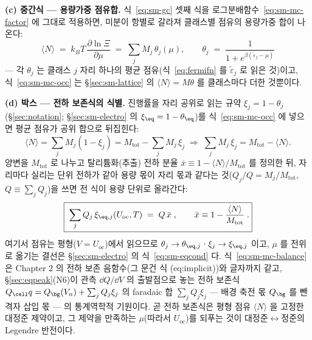 \textbf{(c) 중간식 --- 용량가중 점유합.} 식~\eqref{eq:sm-gc} 셋째 식을 로그분배함수~\eqref{eq:sm-mc-factor} 에
그대로 적용하면, 미분이 항별로 갈라져 클래스별 점유의 용량가중 합이 나온다:
\begin{equation}
\langle N\rangle\;=\;k_BT\,\frac{\partial\ln\Xi}{\partial\mu}
\;=\;\sum_j M_j\,\theta_j(\mu),
\qquad
\theta_j\;=\;\frac{1}{1+e^{\beta(\tilde\varepsilon_j-\mu)}}
\label{eq:sm-mc-occ}
\end{equation}
--- 각 $\theta_j$ 는 클래스 $j$ 자리 하나의 평균 점유(식~\eqref{eq:fermifn} 를 $\tilde\varepsilon_j$ 로 읽은
것)이고, 식~\eqref{eq:sm-mc-occ} 는 \S\ref{sec:sm-lattice} 의 $\langle N\rangle=M\theta$ 를 클래스마다 더한
것뿐이다.

\textbf{(d) 박스 --- 전하 보존식의 식별.} 진행률을 자리 공위로 읽는 규약 $\xi_j=1-\theta_j$(\S\ref{sec:notation};
\S\ref{sec:sm-electro} 의 $\xi_\eq=1-\theta_\eq$)를 식~\eqref{eq:sm-mc-occ} 에 넣으면 평균 점유가 공위 합으로
뒤집힌다:
\begin{equation}
\langle N\rangle=\sum_j M_j(1-\xi_j)=M_\mathrm{tot}-\sum_j M_j\,\xi_j
\;\Longrightarrow\;
\sum_j M_j\,\xi_j=M_\mathrm{tot}-\langle N\rangle.
\label{eq:sm-mc-vac}
\end{equation}
양변을 $M_\mathrm{tot}$ 로 나누고 탈리튬화(추출) 전하 분율 $\bar x\equiv1-\langle N\rangle/M_\mathrm{tot}$ 를
정의한 뒤, 자리마다 실리는 단위 전하가 같아 용량 몫이 자리 몫과 같다는 것($Q_j/Q=M_j/M_\mathrm{tot}$,
$Q\equiv\sum_j Q_j$)을 쓰면 전 식이 용량 단위로 올라간다:
\begin{equation}
\boxed{\;\sum_j Q_j\,\xi_{\eq,j}(U_\mathrm{oc},T)\;=\;Q\,\bar x\;,
\qquad
\bar x\equiv1-\frac{\langle N\rangle}{M_\mathrm{tot}}\;.}
\label{eq:sm-mc-balance}
\end{equation}
여기서 점유는 평형($V=U_\mathrm{oc}$)에서 읽으므로 $\theta_j\to\theta_{\eq,j}$·$\xi_j\to\xi_{\eq,j}$ 이고,
$\mu$ 를 전위로 옮기는 결선은 \S\ref{sec:sm-electro} 의 식~\eqref{eq:sm-eqcond} 다. 식~\eqref{eq:sm-mc-balance}
은 Chapter 2 의 전하 보존 음함수(그 문건 식 (eq:implicit))와 글자까지 같고, \S\ref{sec:eqpeak}(N6)이 관측
$\dd Q/\dd V$ 의 출발점으로 놓는 전하 보존식 $Q_\cell q=Q_\bg(V_n)+\sum_j Q_j\xi_j$ 의 faradaic 합
$\sum_j Q_j\xi_j$ --- 배경 축전 몫 $Q_\bg$ 를 뺀 격자 삽입 몫 --- 의 통계역학적 기원이다. 곧 전하 보존식은
평형 점유 $\langle N\rangle$ 을 고정한 대정준 제약이고, 그 제약을 만족하는 $\mu$(따라서 $U_\mathrm{oc}$)를 되푸는
것이 대정준$\leftrightarrow$정준의 Legendre 반전이다.
